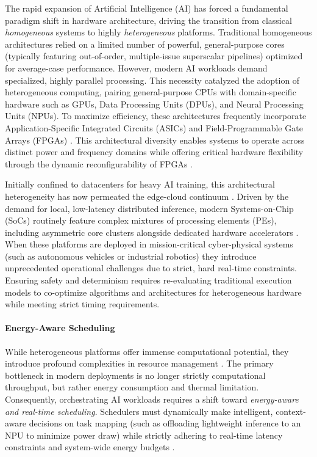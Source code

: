 \documentclass[11pt,a4paper]{article}
\begin{document}
The rapid expansion of Artificial Intelligence (AI) has forced a fundamental paradigm shift in hardware architecture, driving the transition from classical \textit{homogeneous} systems to highly \textit{heterogeneous} platforms. Traditional homogeneous architectures relied on a limited number of powerful, general-purpose cores (typically featuring out-of-order, multiple-issue superscalar pipelines) optimized for average-case performance. However, modern AI workloads demand specialized, highly parallel processing. This necessity catalyzed the adoption of heterogeneous computing, pairing general-purpose CPUs with domain-specific hardware such as GPUs, Data Processing Units (DPUs), and Neural Processing Units (NPUs). To maximize efficiency, these architectures frequently incorporate Application-Specific Integrated Circuits (ASICs) and Field-Programmable Gate Arrays (FPGAs) \cite{mittal2015survey, 9567066}. This architectural diversity enables systems to operate across distinct power and frequency domains while offering critical hardware flexibility through the dynamic reconfigurability of FPGAs \cite{maisto2026compute}.

Initially confined to datacenters for heavy AI training, this architectural heterogeneity has now permeated the edge-cloud continuum \cite{moreschini2022cloud}. Driven by the demand for local, low-latency distributed inference, modern Systems-on-Chip (SoCs) routinely feature complex mixtures of processing elements (PEs), including asymmetric core clusters alongside dedicated hardware accelerators \cite{maisto2026compute}. When these platforms are deployed in mission-critical cyber-physical systems (such as autonomous vehicles or industrial robotics) they introduce unprecedented operational challenges due to strict, hard real-time constraints. Ensuring safety and determinism requires re-evaluating traditional execution models to co-optimize algorithms and architectures for heterogeneous hardware while meeting strict timing requirements.

\paragraph{Energy-Aware Scheduling}
While heterogeneous platforms offer immense computational potential, they introduce profound complexities in resource management \cite{chen2022energy}. The primary bottleneck in modern deployments is no longer strictly computational throughput, but rather energy consumption and thermal limitation. Consequently, orchestrating AI workloads requires a shift toward \textit{energy-aware and real-time scheduling}. Schedulers must dynamically make intelligent, context-aware decisions on task mapping (such as offloading lightweight inference to an NPU to minimize power draw) while strictly adhering to real-time latency constraints and system-wide energy budgets \cite{bambagini2016energy}.
\end{document}
